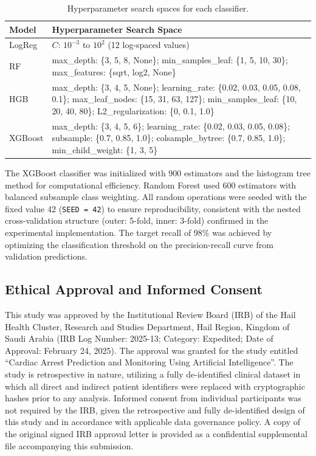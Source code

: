\documentclass[fleqn,10pt,lineno]{wlpeerj}
\begin{document}
\begin{table}[ht]
\small
\begin{tabularx}{\linewidth}{lL}
\toprule
\textbf{Model} & \textbf{Hyperparameter Search Space} \\
\midrule
LogReg & $C$: $10^{-3}$ to $10^{2}$ (12 log-spaced values) \\
\addlinespace
RF & max\_depth: \{3, 5, 8, None\}; min\_samples\_leaf: \{1, 5, 10, 30\}; max\_features: \{sqrt, log2, None\} \\
\addlinespace
HGB & max\_depth: \{3, 4, 5, None\}; learning\_rate: \{0.02, 0.03, 0.05, 0.08, 0.1\}; max\_leaf\_nodes: \{15, 31, 63, 127\}; min\_samples\_leaf: \{10, 20, 40, 80\}; L2\_regularization: \{0, 0.1, 1.0\} \\
\addlinespace
XGBoost & max\_depth: \{3, 4, 5, 6\}; learning\_rate: \{0.02, 0.03, 0.05, 0.08\}; subsample: \{0.7, 0.85, 1.0\}; colsample\_bytree: \{0.7, 0.85, 1.0\}; min\_child\_weight: \{1, 3, 5\} \\
\bottomrule
\end{tabularx}
\caption{Hyperparameter search spaces for each classifier.}
\label{tab:hyperparams}
\end{table}

The XGBoost classifier was initialized with 900 estimators and the histogram tree method for computational efficiency. Random Forest used 600 estimators with balanced subsample class weighting. All random operations were seeded with the fixed value 42 (\texttt{SEED = 42}) to ensure reproducibility, consistent with the nested cross-validation structure (outer: 5-fold, inner: 3-fold) confirmed in the experimental implementation. The target recall of 98\% was achieved by optimizing the classification threshold on the precision-recall curve from validation predictions.

\subsection*{Ethical Approval and Informed Consent}

This study was approved by the Institutional Review Board (IRB) of the Hail Health Cluster, Research and Studies Department, Hail Region, Kingdom of Saudi Arabia (IRB Log Number: 2025-13; Category: Expedited; Date of Approval: February 24, 2025). The approval was granted for the study entitled ``Cardiac Arrest Prediction and Monitoring Using Artificial Intelligence''. The study is retrospective in nature, utilizing a fully de-identified clinical dataset in which all direct and indirect patient identifiers were replaced with cryptographic hashes prior to any analysis. Informed consent from individual participants was not required by the IRB, given the retrospective and fully de-identified design of this study and in accordance with applicable data governance policy. A copy of the original signed IRB approval letter is provided as a confidential supplemental file accompanying this submission.
\end{document}
